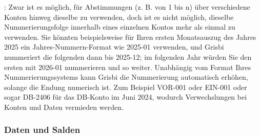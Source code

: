 \Note{}: Zwar ist es möglich, für Abstimmungen (z. B. von 1 bis n) über verschiedene Konten hinweg dieselbe  zu verwenden, doch ist es nicht möglich, dieselbe Nummerierungsfolge innerhalb eines einzelnen Kontos mehr als einmal zu verwenden. Sie könnten beispielsweise für Ihren ersten Monatsauszug des Jahres 2025 ein Jahres-Nummern-Format wie 2025-01 verwenden, und Grisbi nummeriert die folgenden dann bis 2025-12; im folgenden Jahr würden Sie den ersten mit 2026-01 nummerieren und so weiter. Unabhängig vom Format Ihres Nummerierungssystems kann Grisbi die Nummerierung automatisch erhöhen, solange die Endung numerisch ist. Zum Beispiel VOR-001 oder EIN-001 oder sogar DB-2406 für das DB-Konto im Juni 2024, wodurch Verwechslungen bei Konten und Daten vermieden werden.


\subsubsection{Daten und Salden\label{reconciliation-account-description-DateBalance}}

